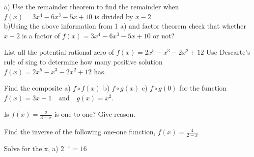 \documentclass{exam}
\begin{document}
 
\begin{center}
\end{center}
 
\vspace{5mm}
 
 
\vspace{5mm}
 
 
\begin{questions}
	
	\question 
	\subitem a) Use the remainder theorem to find the remainder when $f(x)=3x^4-6x^3-5x+10$ is divided by $x-2$. \\
	 
	
	\subitem b)Using the above information from 1 a) and factor theorem check that whether $x-2$ is a factor of $f(x)=3x^4-6x^3-5x+10$ or not?
		\hfill\enspace\hrulefill
	
	\clearpage
	\question List all the potential rational zero of $f(x)=2x^5-x^3-2x^2+12$
	\hfill\enspace\hrulefill
	\question Use Descarte's rule of sing to determine how many positive solution $f(x)=2x^5-x^3-2x^2+12$ has.
	\hfill\enspace\hrulefill
	\clearpage
	
	\question Find the composite a) $f\circ f(x)$ b) $f\circ g(x)$ c) $f\circ g (0)$ for the function $f(x)=3x+1 \quad\mbox{and} \quad g(x)=x^2$.
	\hfill\enspace\hrulefill 
	
	\clearpage
	\question Is $f(x) =\frac{2}{3+x}$ is one to one? Give reason. 
	\hfill\enspace\hrulefill 
	
	
	
	
	\question Find the inverse of the following one-one function, $f(x)=\frac{4}{2-x} $
		\hfill\enspace\hrulefill 
		
\clearpage
		
	\question Solve for the x,
	\subitem a) \(2^{-x}=16\) \hfill\enspace\hrulefill 
	

\end{questions}
\end{document}
